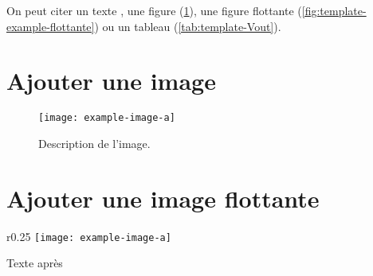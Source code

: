 On peut citer
un texte \cite{boutin_en_2009},
une figure (\ref{fig:template-example-image}),
une figure flottante (\ref{fig:template-example-flottante}) ou
un tableau (\ref{tab:template-Vout}).

\section{Ajouter une image}

\begin{figure}[h!]
    \centering
    \texttt{[image: example-image-a]}
    \caption{Description de l'image.}
    \label{fig:template-example-image}
\end{figure}

\section{Ajouter une image flottante}

\begin{wrapfigure}{r}{0.25\linewidth}
    \centering
    \texttt{[image: example-image-a]}
    \caption{Description de l'image.}
    \label{fig:template-example-flottante}
\end{wrapfigure}

Texte après
